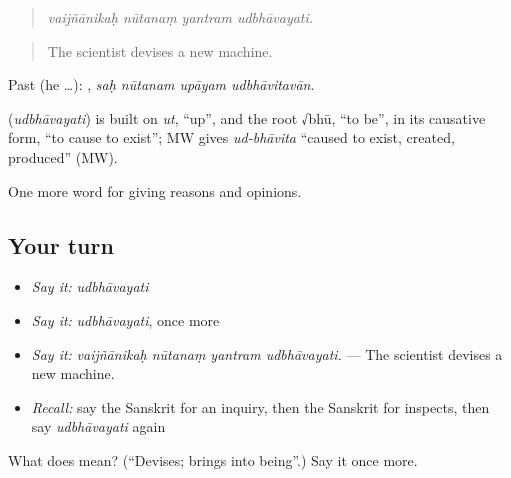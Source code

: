 \begin{quote}
\emph{vaijñānikaḥ nūtanaṃ yantram udbhāvayati.}
\end{quote}

\begin{quote}
The scientist devises a new machine.
\end{quote}

Past (he …):    , \emph{saḥ nūtanam upāyam udbhāvitavān}.

\begin{cousinweb}
\textbf{} (\emph{udbhāvayati}) is built on \emph{ut}, \textquotedblleft{}up\textquotedblright{}, and the root √bhū, \textquotedblleft{}to be\textquotedblright{}, in its causative form, \textquotedblleft{}to cause to exist\textquotedblright{}; MW gives \emph{ud-bhāvita} \textquotedblleft{}caused to exist, created, produced\textquotedblright{} (MW).
\end{cousinweb}

\begin{grammarlens}[title={What you've built}]
One more word for giving reasons and opinions.
\end{grammarlens}

\subsection*{Your turn}
\begin{itemize}
\raggedright
  \item \emph{Say it:} \emph{udbhāvayati}
  \item \emph{Say it:} \emph{udbhāvayati}, once more
  \item \emph{Say it:} \emph{vaijñānikaḥ nūtanaṃ yantram udbhāvayati.} — The scientist devises a new machine.
  \item \emph{Recall:} say the Sanskrit for an inquiry, then the Sanskrit for inspects, then say \emph{udbhāvayati} again
\end{itemize}

\begin{tcolorbox}[breakable,colback=teal!4,colframe=teal!35!black,title={Before you move on}]
What does  mean? (\textquotedblleft{}Devises; brings into being\textquotedblright{}.) Say it once more.
\end{tcolorbox}
